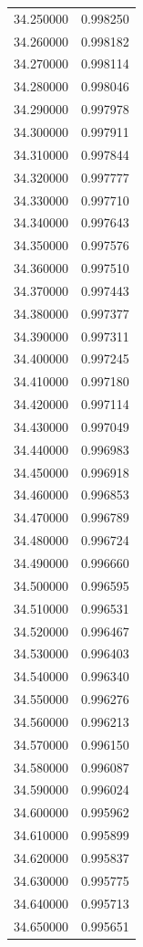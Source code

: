 \begin{tabular}{rr}
34.250000 & 0.998250 \\
34.260000 & 0.998182 \\
34.270000 & 0.998114 \\
34.280000 & 0.998046 \\
34.290000 & 0.997978 \\
34.300000 & 0.997911 \\
34.310000 & 0.997844 \\
34.320000 & 0.997777 \\
34.330000 & 0.997710 \\
34.340000 & 0.997643 \\
34.350000 & 0.997576 \\
34.360000 & 0.997510 \\
34.370000 & 0.997443 \\
34.380000 & 0.997377 \\
34.390000 & 0.997311 \\
34.400000 & 0.997245 \\
34.410000 & 0.997180 \\
34.420000 & 0.997114 \\
34.430000 & 0.997049 \\
34.440000 & 0.996983 \\
34.450000 & 0.996918 \\
34.460000 & 0.996853 \\
34.470000 & 0.996789 \\
34.480000 & 0.996724 \\
34.490000 & 0.996660 \\
34.500000 & 0.996595 \\
34.510000 & 0.996531 \\
34.520000 & 0.996467 \\
34.530000 & 0.996403 \\
34.540000 & 0.996340 \\
34.550000 & 0.996276 \\
34.560000 & 0.996213 \\
34.570000 & 0.996150 \\
34.580000 & 0.996087 \\
34.590000 & 0.996024 \\
34.600000 & 0.995962 \\
34.610000 & 0.995899 \\
34.620000 & 0.995837 \\
34.630000 & 0.995775 \\
34.640000 & 0.995713 \\
34.650000 & 0.995651 \\

\end{tabular}
